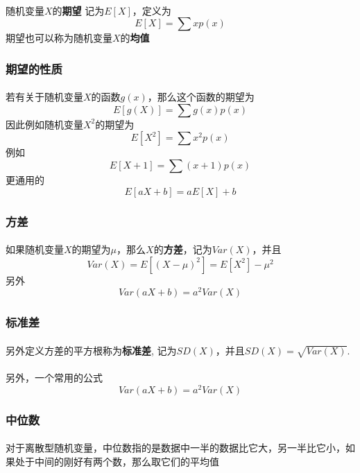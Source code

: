 \paragraph{}
随机变量$X$的\textbf{期望} 记为$E[X]$，定义为
$$
E[X] = \sum x p(x)
$$
期望也可以称为随机变量$X$的\textbf{均值}

\subsubsection{期望的性质}
\paragraph{}
若有关于随机变量$X$的函数$g(x)$，那么这个函数的期望为
$$
E[g(X)] = \sum g(x) p(x)
$$
因此例如随机变量$X^2$的期望为
$$
E[X^2] = \sum x^2 p(x)
$$
例如
$$
E[X+1] = \sum (x+1) p(x)
$$
更通用的
$$
E[aX+b] = aE[X] + b
$$

	
\subsubsection{方差}
\paragraph{}
如果随机变量$X$的期望为$\mu$，那么$X$的\textbf{方差}，记为$Var(X)$，并且
$$
Var(X) = E[(X - \mu)^2] = E[X^2] - \mu^2
$$
另外
$$
Var(aX+b) = a^2Var(X)
$$

\subsubsection{标准差}
\paragraph{}
另外定义方差的平方根称为\textbf{标准差}, 记为$SD(X)$，并且$SD(X) = \sqrt{Var(X)}$.

\paragraph{}
另外，一个常用的公式
$$
Var(aX + b) = a^2 Var(X)
$$

\subsubsection{中位数}
\paragraph{}
对于离散型随机变量，中位数指的是数据中一半的数据比它大，另一半比它小，如果处于中间的刚好有两个数，那么取它们的平均值

